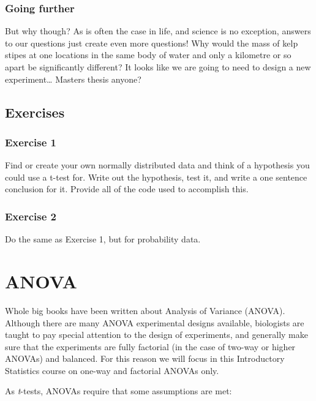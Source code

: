 \documentclass[english,10pt,a4paper,oneside]{book}
\theoremstyle{definition}
\theoremstyle{definition}
\theoremstyle{definition}
\theoremstyle{remark}
\begin{document}
\hypertarget{going-further}{%
\subsection{Going further}\label{going-further}}

But why though? As is often the case in life, and science is no
exception, answers to our questions just create even more questions! Why
would the mass of kelp stipes at one locations in the same body of water
and only a kilometre or so apart be significantly different? It looks
like we are going to need to design a new experiment\ldots{} Masters
thesis anyone?

\hypertarget{exercises-3}{%
\section{Exercises}\label{exercises-3}}

\hypertarget{exercise-1-3}{%
\subsection{Exercise 1}\label{exercise-1-3}}

Find or create your own normally distributed data and think of a
hypothesis you could use a t-test for. Write out the hypothesis, test
it, and write a one sentence conclusion for it. Provide all of the code
used to accomplish this.

\hypertarget{exercise-2}{%
\subsection{Exercise 2}\label{exercise-2}}

Do the same as Exercise 1, but for probability data.

\hypertarget{anova}{%
\chapter{ANOVA}\label{anova}}

Whole big books have been written about Analysis of Variance (ANOVA).
Although there are many ANOVA experimental designs available, biologists
are taught to pay special attention to the design of experiments, and
generally make sure that the experiments are fully factorial (in the
case of two-way or higher ANOVAs) and balanced. For this reason we will
focus in this Introductory Statistics course on one-way and factorial
ANOVAs only.

As \emph{t}-tests, ANOVAs require that some assumptions are met:
\end{document}
